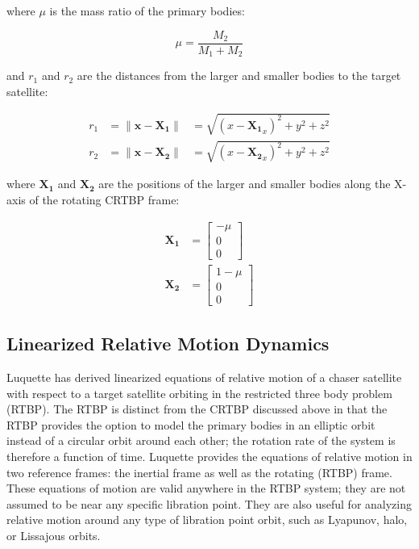 \documentclass[letterpaper, preprint, paper,11pt]{AAS}	%
\begin{document}
where \(\mu\) is the mass ratio of the primary bodies:

\begin{equation*}
	\mu = \frac{M_2}{M_1 + M_2}
\end{equation*}

and \(r_1\) and \(r_2\) are the distances from the larger and smaller bodies to the target satellite:

\begin{equation*}
	\begin{aligned}
		r_1 &= \| \mathbf{x} - \mathbf{X_1} \| &= \sqrt{(x-\mathbf{X_1}_x)^2 + y^2 + z^2} \\
		r_2 &= \| \mathbf{x} - \mathbf{X_2} \| &= \sqrt{(x-\mathbf{X_2}_x)^2 + y^2 + z^2}
	\end{aligned}
\end{equation*}

where \(\mathbf{X_1}\) and \(\mathbf{X_2}\) are the positions of the larger and smaller bodies along the X-axis of the rotating CRTBP frame:

\begin{equation*}
	\begin{aligned}
		\mathbf{X_1} &= \begin{bmatrix}
			-\mu \\ 0 \\ 0 
		\end{bmatrix} \\
		\mathbf{X_2} &= \begin{bmatrix}
			1 - \mu \\ 0 \\ 0
		\end{bmatrix}
	\end{aligned}
\end{equation*}


\subsection{Linearized Relative Motion Dynamics}
Luquette \cite{luquette2004} has derived linearized equations of relative motion of a chaser satellite with respect to a target satellite orbiting in the restricted three body problem (RTBP). The RTBP is distinct from the CRTBP discussed above in that the RTBP provides the option to model the primary bodies in an elliptic orbit instead of a circular orbit around each other; the rotation rate of the system is therefore a function of time. Luquette provides the equations of relative motion in two reference frames: the inertial frame as well as the rotating (RTBP) frame.  These equations of motion are valid anywhere in the RTBP system; they are not assumed to be near any specific libration point.  They are also useful for analyzing relative motion around any type of libration point orbit, such as Lyapunov, halo, or Lissajous orbits. 
\end{document}
